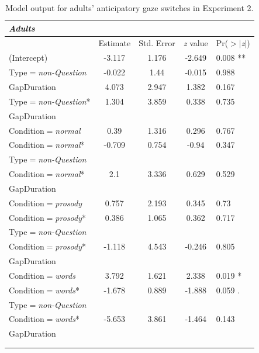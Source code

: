\documentclass[authoryear, 12pt]{elsarticle}
\begin{document}
\linespread{1}
\begin{minipage}[t]{0.95\linewidth}
\begin{footnotesize}
\begin{longtable}{lcccl}
  \textbf{\textit{Adults}} &&&& \\
    \hline
           &  Estimate & Std. Error & \textit{z} value & Pr($>$$|$\textit{z}$|$) \\    
    \hline
    (Intercept)										& -3.117		& 1.176	& -2.649	& 0.008 **				\\ 
    Type$=$\textit{non-Question}			& -0.022		& 1.44	& -0.015	& 0.988					\\ 
    GapDuration										&  4.073		& 2.947	&  1.382	& 0.167					\\ 
    Type$=$\textit{non-Question}*			&  1.304		& 3.859	&  0.338	& 0.735					\\
    \hspace*{5mm} GapDuration &&&& \\
	\hline
    Condition$=$\textit{normal}				&  0.39		& 1.316	&  0.296	& 0.767						\\ 
    Condition$=$\textit{normal}*			& -0.709		& 0.754	& -0.94		& 0.347					\\ 
    \hspace*{5mm} Type$=$\textit{non-Question} &&&& \\
    Condition$=$\textit{normal}*			&  2.1			& 3.336	&  0.629	& 0.529					\\ 
    \hspace*{5mm} GapDuration &&&& \\
	\hline
    Condition$=$\textit{prosody}			&  0.757		& 2.193	&  0.345	& 0.73					\\ 
    Condition$=$\textit{prosody}*			&  0.386		& 1.065	&  0.362	& 0.717					\\ 
    \hspace*{5mm} Type$=$\textit{non-Question} &&&& \\
    Condition$=$\textit{prosody}*			& -1.118		& 4.543	& -0.246	& 0.805					\\ 
    \hspace*{5mm} GapDuration &&&& \\
	\hline
    Condition$=$\textit{words}				&  3.792		& 1.621	&  2.338	& 0.019 *				\\ 
    Condition$=$\textit{words}*				& -1.678		& 0.889	& -1.888	& 0.059 .				\\ 
    \hspace*{5mm} Type$=$\textit{non-Question} &&&& \\
    Condition$=$\textit{words}*				& -5.653		& 3.861	& -1.464	& 0.143					\\ 
    \hspace*{5mm} GapDuration &&&& \\
    \hline
    &&&& \\
  \caption{Model output for adults' anticipatory gaze switches in Experiment 2.}
\label{tab:E2-adumodels}
\end{longtable}
\end{footnotesize}
\end{minipage}
\end{document}
